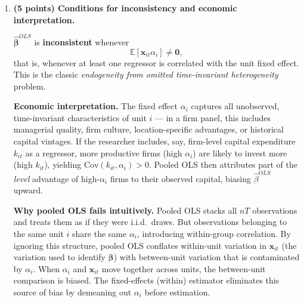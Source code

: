 \documentclass[letterpaper,12pt]{article}
\begin{document}
\begin{enumerate}[label=(\alph*)]
\textit{Term 3.} By strict exogeneity, $\mathbb{E}[\varepsilon_{it}|\bm{x}_{i1},\ldots,\bm{x}_{iT},\alpha_i]=0$, so $\mathbb{E}[\bm{x}_{it}\varepsilon_{it}]=\bm{0}$. By the \textbf{LLN}:
\[
\frac{1}{nT}\bm{X}'\bm{\varepsilon} \xrightarrow{p} \mathbb{E}[\bm{x}_{it}\varepsilon_{it}] = \bm{0}.
\]

Applying \textbf{Slutsky's theorem}:
\[
\boxed{\mathrm{plim}\;\hat{\bm{\beta}}^{OLS} = \bm{\beta} + S_{XX}^{-1}\,\mathbb{E}[\bm{x}_{it}\alpha_i].}
\]
The pooled OLS estimator converges to $\bm{\beta}$ plus an \textit{omitted variable bias} term driven by the correlation between regressors and fixed effects.

\item \textbf{(5 points) Conditions for inconsistency and economic interpretation.}

\medskip
$\hat{\bm{\beta}}^{OLS}$ is \textbf{inconsistent} whenever
\[
\mathbb{E}[\bm{x}_{it}\alpha_i] \neq \bm{0},
\]
that is, whenever at least one regressor is correlated with the unit fixed effect. This is the classic \emph{endogeneity from omitted time-invariant heterogeneity} problem.

\textbf{Economic interpretation.} The fixed effect $\alpha_i$ captures all unobserved, time-invariant characteristics of unit $i$ — in a firm panel, this includes managerial quality, firm culture, location-specific advantages, or historical capital vintages. If the researcher includes, say, firm-level capital expenditure $k_{it}$ as a regressor, more productive firms (high $\alpha_i$) are likely to invest more (high $k_{it}$), yielding $\text{Cov}(k_{it},\alpha_i)>0$. Pooled OLS then attributes part of the \emph{level} advantage of high-$\alpha_i$ firms to their observed capital, biasing $\hat{\beta}^{OLS}$ upward.

\textbf{Why pooled OLS fails intuitively.} Pooled OLS stacks all $nT$ observations and treats them as if they were i.i.d.\ draws. But observations belonging to the same unit $i$ share the same $\alpha_i$, introducing within-group correlation. By ignoring this structure, pooled OLS conflates within-unit variation in $\bm{x}_{it}$ (the variation used to identify $\bm{\beta}$) with between-unit variation that is contaminated by $\alpha_i$. When $\alpha_i$ and $\bm{x}_{it}$ move together across units, the between-unit comparison is biased. The fixed-effects (within) estimator eliminates this source of bias by demeaning out $\alpha_i$ before estimation.

\end{enumerate}
\end{document}
